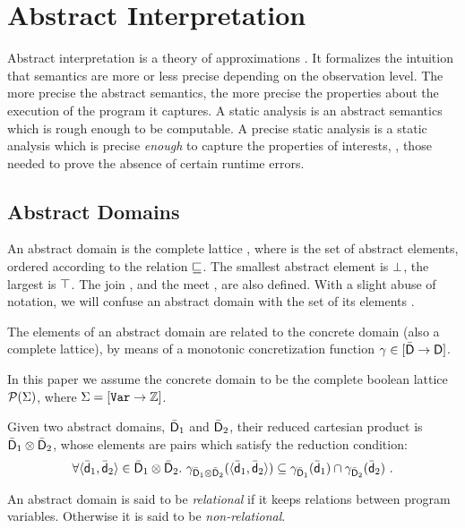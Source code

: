 \documentclass{llncs}
\newcommand{\comment}[1]{}
\begin{document}
\section{Abstract Interpretation}
Abstract interpretation is a theory of approximations
\cite{CousotCousot77}.  It formalizes the intuition that semantics are
more or less precise depending on the observation level.  The more
precise the abstract semantics, the more precise the properties about
the execution of the program it captures.  A static analysis is an
abstract semantics which is rough enough to be computable.  A precise
static analysis is a static analysis which is precise \emph{enough} to
capture the properties of interests, \eg, those needed to prove the
absence of certain runtime errors.

\subsection{Abstract Domains}
An abstract domain  is the complete lattice
, where  is the
set of abstract elements, ordered according to the relation ${\sqsubseteq}$. 
The smallest abstract element is ${\bot}$, the largest is ${\top}$. 
The join \acup, and the meet \acap,  are also defined.
With a slight abuse of notation, we will confuse an  abstract domain  with the set of its elements .

The elements of an abstract domain are related to the concrete domain
 (also a complete lattice), by means of a monotonic
concretization function $\gamma \in [\bar{\mathsf{D}} \rightarrow\mathsf{D}]$.
\comment{
\footnote{We do not require a best abstraction function
$\alpha$, thus putting ourselves in a more generic framework than the
one based on Galois connections,~\cite{CousotCousot92-2}.}. 
}
In this
paper we assume the concrete domain to be the complete boolean lattice
$\mathcal{P}{(\Sigma)}$, where $\Sigma = [\mathtt{Var} \rightarrow\mathbb{Z}]$.

Given two abstract domains, $\bar{\mathsf{D}}_1$ and $\bar{\mathsf{D}}_2$, their reduced cartesian product  is $\bar{\mathsf{D}}_1 \otimes \bar{\mathsf{D}}_2$, whose elements are pairs which satisfy the reduction condition: 
\[
\forall \tupla{\ael{d}_1, \ael{d}_2} \in \adom{D}_1 \otimes \adom{D}_2.\ \gamma_{\adom{D}_1 \otimes \adom{D}_2}(\tupla{\ael{d}_1, \ael{d}_2}) \subseteq \gamma_{\adom{D}_1}(\ael{d}_1) \cap \gamma_{\adom{D}_2}(\ael{d}_2) \ .
\]

An abstract domain is said to be \emph{relational} if it keeps
relations between program variables.  Otherwise it is said to be
\emph{non-relational}.
\end{document}
